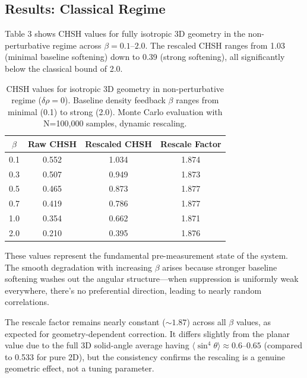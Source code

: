 \subsection*{Results: Classical Regime}

Table 3 shows CHSH values for fully isotropic 3D geometry in the non-perturbative regime across $\beta = 0.1$--$2.0$. The rescaled CHSH ranges from 1.03 (minimal baseline softening) down to 0.39 (strong softening), all significantly below the classical bound of 2.0.

\begin{table}[h]
\centering
\caption{CHSH values for isotropic 3D geometry in non-perturbative regime ($\delta\rho = 0$). Baseline density feedback $\beta$ ranges from minimal (0.1) to strong (2.0). Monte Carlo evaluation with N=100,000 samples, dynamic rescaling.}
\label{P8:tab:isotropic_nonpert_chsh}
\begin{tabular}{c|c|c|c}
\hline
$\beta$ & Raw CHSH & Rescaled CHSH & Rescale Factor \\
\hline
0.1 & 0.552 & 1.034 & 1.874 \\
0.3 & 0.507 & 0.949 & 1.873 \\
0.5 & 0.465 & 0.873 & 1.877 \\
0.7 & 0.419 & 0.786 & 1.877 \\
1.0 & 0.354 & 0.662 & 1.871 \\
2.0 & 0.210 & 0.395 & 1.876 \\
\hline
\end{tabular}
\end{table}

These values represent the fundamental pre-measurement state of the system. The smooth degradation with increasing $\beta$ arises because stronger baseline softening washes out the angular structure---when suppression is uniformly weak everywhere, there's no preferential direction, leading to nearly random correlations.

The rescale factor remains nearly constant ($\sim 1.87$) across all $\beta$ values, as expected for geometry-dependent correction. It differs slightly from the planar value due to the full 3D solid-angle average having $\langle \sin^4\theta \rangle \approx 0.6$--$0.65$ (compared to 0.533 for pure 2D), but the consistency confirms the rescaling is a genuine geometric effect, not a tuning parameter.

